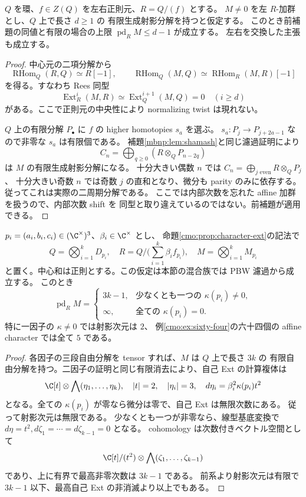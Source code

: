 \begin{corollary}
\label{cmo:cor:hypersurface-pd}
$Q$ を環、$f\in Z(Q)$ を左右正則元、$R=Q/(f)$ とする。
$M\ne0$ を左 $R$-加群とし、$Q$ 上で長さ $d\ge1$ の
有限生成射影分解を持つと仮定する。
このとき前補題の同値と有限の場合の上限 $\operatorname{pd}_R M\le d-1$ が成立する。
左右を交換した主張も成立する。
\end{corollary}
\begin{proof}
中心元の二項分解から
\[
 \operatorname{RHom}_Q(R,Q)\simeq R[-1],\qquad
 \operatorname{RHom}_Q(M,Q)\simeq
 \operatorname{RHom}_R(M,R)[-1]
\]
を得る。すなわち Rees 同型
\[
 \operatorname{Ext}_R^i(M,R)\simeq
 \operatorname{Ext}_Q^{i+1}(M,Q)=0\quad(i\ge d)
\]
がある。ここで正則元の中央性により normalizing twist は現れない。

$Q$ 上の有限分解 $P_\bullet$ に $f$ の higher homotopies $s_a$ を選ぶ。
$s_a:P_j\to P_{j+2a-1}$ なので非零な $s_a$ は有限個である。
補題\ref{mbnp:lem:shamash}と同じ濾過証明により
\[
 C_n=\bigoplus_{q\ge0}(R\otimes_QP_{n-2q})
\]
は $M$ の有限生成射影分解になる。
十分大きい偶数 $n$ では $C_n=\bigoplus_{j\text{ even}}R\otimes_QP_j$、
十分大きい奇数 $n$ では奇数 $j$ の直和となり、微分も parity のみに依存する。
従ってこれは実際の二周期分解である。
ここでは内部次数を忘れた affine 加群を扱うので、内部次数 shift を
同型と取り違えているのではない。前補題が適用できる。
\end{proof}

\begin{proposition}
\label{cmo:prop:character-pd}
$p_i=(a_i,b_i,c_i)\in(\C^\times)^3$、$\beta_i\in\C^\times$ とし、
命題\ref{cmo:prop:character-ext}の記法で
\[
 Q=\bigotimes_{i=1}^kD_{p_i},\quad
 R=Q\Big/\Big(\sum_{i=1}^k\beta_if_{p_i}\Big),\quad
 M=\bigotimes_{i=1}^kM_{p_i}
\]
と置く。中心和は正則とする。この仮定は本節の混合族では PBW 濾過から成立する。
このとき
\[
 \operatorname{pd}_R M=
 \begin{cases}
  3k-1,&\text{少なくとも一つの }\kappa(p_i)\ne0,\\
  \infty,&\text{全ての }\kappa(p_i)=0.
 \end{cases}
\]
特に一因子の $\kappa\ne0$ では射影次元は $2$、
例\ref{cmo:ex:sixty-four}の六十四個の affine character では全て $5$ である。
\end{proposition}
\begin{proof}
各因子の三段自由分解を tensor すれば、$M$ は $Q$ 上で長さ $3k$ の
有限自由分解を持つ。二因子の証明と同じ有限消去により、自己 Ext の計算複体は
\[
 \C[t]\otimes\bigwedge(\eta_1,\ldots,\eta_k),\quad
 |t|=2,\quad|\eta_i|=3,\quad d\eta_i=\beta_i^2\kappa(p_i)t^2
\]
となる。全ての $\kappa(p_i)$ が零なら微分は零で、自己 Ext は無限次数にある。
従って射影次元は無限である。
少なくとも一つが非零なら、線型基底変換で
$d\eta=t^2,d\zeta_1=\cdots=d\zeta_{k-1}=0$ となる。
cohomology は次数付きベクトル空間として
\[
 \C[t]/(t^2)\otimes\bigwedge(\zeta_1,\ldots,\zeta_{k-1})
\]
であり、上に有界で最高非零次数は $3k-1$ である。
前系より射影次元は有限で $3k-1$ 以下、最高自己 Ext の非消滅より以上でもある。
\end{proof}

